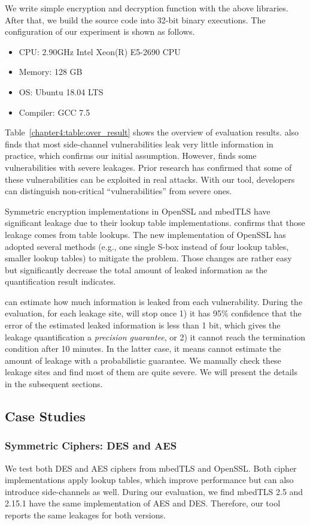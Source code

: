We write simple encryption and decryption function with the above libraries. After that, we build
the source code into 32-bit binary executions. The configuration of our experiment is shown as follows.
\begin{itemize}
\item CPU: 2.90GHz Intel Xeon(R) E5-2690 CPU
\item Memory: 128 GB
\item OS: Ubuntu 18.04 LTS
\item Compiler: GCC 7.5
\end{itemize}

Table~\ref{chapter4:table:over_result} shows the overview of evaluation results. 
\tool{} also finds that most side-channel
vulnerabilities leak very little information in practice, which confirms our
initial assumption.  
However, \tool{} finds some vulnerabilities with severe
leakages. Prior research has confirmed that some of these
vulnerabilities can be exploited in real attacks.
With our tool, developers can
distinguish non-critical ``vulnerabilities'' from severe ones.

Symmetric encryption implementations in OpenSSL and mbedTLS have significant leakage due to their lookup table implementations. 
\tool{} confirms that those leakage comes from table lookups. The new implementation of OpenSSL has adopted several methods (e.g., one single S-box instead of four lookup tables, smaller lookup tables) to mitigate the problem. Those changes are rather easy but significantly decrease the total amount of leaked information as the quantification result indicates.

\tool{} can estimate how
much information is leaked from each vulnerability. During the evaluation,
for each leakage site, \tool{} will stop once 1) it has 95\% confidence
that the error of the estimated leaked information is less than 1 bit,
which gives the leakage quantification a \emph{precision guarantee}, 
or 2) it cannot reach the termination condition after 10 minutes.  In
the latter case, it means \tool{} cannot estimate the amount of leakage with a
probabilistic guarantee. We manually check these leakage sites and find most of them are quite severe.
We will present the details in the subsequent sections.

\subsection{Case Studies}

\subsubsection{Symmetric Ciphers: DES and AES}\label{eval:sym}
We test both DES and AES ciphers from mbedTLS and OpenSSL\@. Both cipher implementations apply lookup tables, which improve performance but can also introduce side-channels as well. During our evaluation, we find mbedTLS 2.5 and 2.15.1 have the same implementation of AES and DES\@. Therefore, our tool reports the same leakages for both versions.

